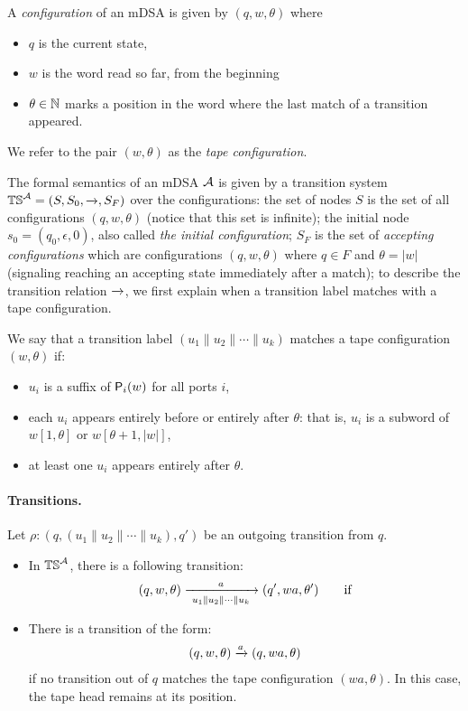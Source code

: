   A \emph{configuration} of an mDSA is given by $(q, w, \theta)$ where
  \begin{itemize}
  \item $q$ is the current state,
  \item $w$ is the word read so far, from the beginning
  \item $\theta \in \mathbb{N}$ marks a position in the word where the last match of a transition appeared.  
  \end{itemize} 
  We refer to the pair $(w, \theta)$ as the \emph{tape configuration}.
  
  The formal semantics of an mDSA $\mathcal{A}$ is given by a transition system $\mathbb{TS}^{\mathcal{A}} = (S, S_0, \xrightarrow{}, S_F)$  over the configurations: the set of nodes $S$ is  the set of all configurations $(q, w, \theta)$ (notice that this set is infinite); the initial node $s_0 = (q_0, \epsilon, 0)$, also called \emph{the initial configuration}; $S_F$  is the set of \emph{accepting configurations} which are configurations $(q, w, \theta)$ where $q \in F$ and $\theta = |w|$ (signaling reaching an accepting state immediately after a match); to describe the transition relation $\xrightarrow{}$, we first explain when a transition label matches with a tape configuration. 

  \begin{definition}\label{def:match}
    We say that a transition label $(u_1 \parallel u_2 \parallel \cdots \parallel u_k)$ matches a tape configuration $(w, \theta)$ if:
    \begin{itemize}
      \item $u_i$ is a suffix of $\mathsf{P}_{i}(w)$ for all ports $i$,
      \item each $u_i$ appears entirely before or entirely after $\theta$: that is, $u_i$ is a subword of $w[1, \theta]$ or $w[\theta+1, |w|]$,
      \item at least one $u_i$ appears entirely after $\theta$.
    \end{itemize}
  \end{definition}

\paragraph*{Transitions.} Let $\rho: (q, (u_1 \parallel u_2 \parallel \cdots \parallel u_k), q')$ be an outgoing transition from $q$. 
\begin{itemize}
\item In $\mathbb{TS}^{\mathcal{A}}$, there is a following transition:
\begin{align*}
 (q, w, \theta) \xrightarrow[~u_1 \parallel u_2 \parallel \cdots \parallel u_k~]{a} (q', wa, \theta') \qquad \text{if}
\end{align*}

\item There is a transition of the form:
\begin{align*}
  (q, w, \theta) \xrightarrow{a} (q, wa, \theta)
\end{align*}
if no transition out of $q$ matches the tape configuration $(wa, \theta)$. In this case, the tape head remains at its position.
\end{itemize} 


